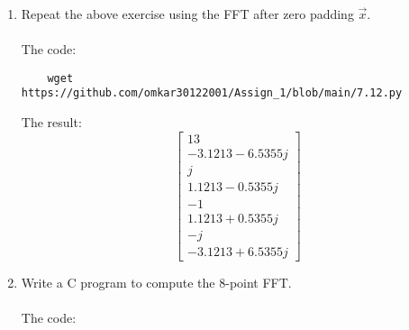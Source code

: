 \documentclass[journal,12pt,twocolumn]{IEEEtran}
\renewcommand\thesection{\arabic{section}}
\begin{document}
\begin{enumerate}[label=\thesection.\arabic*
	,ref=\thesection.\theenumi]
\begin{enumerate}[label=\arabic*.,ref=\thesection.\theenumi]
\begin{align}
\begin{bsmallmatrix}
			1	&	\brak{e^{\frac{-j2\pi}{6}}}^3	&	\brak{e^{\frac{-j2\pi}{6}}}^6	&	\brak{e^{\frac{-j2\pi}{6}}}^9	&	\brak{e^{\frac{-j2\pi}{6}}}^{12}	&	\brak{e^{\frac{-j2\pi}{6}}}^{15}\\
			1	&	\brak{e^{\frac{-j2\pi}{6}}}^4	&	\brak{e^{\frac{-j2\pi}{6}}}^8	&	\brak{e^{\frac{-j2\pi}{6}}}^{12}	&	\brak{e^{\frac{-j2\pi}{6}}}^{16}	&	\brak{e^{\frac{-j2\pi}{6}}}^{20}\\
			1	&	\brak{e^{\frac{-j2\pi}{6}}}^5	&	\brak{e^{\frac{-j2\pi}{6}}}^{10}	&	\brak{e^{\frac{-j2\pi}{6}}}^{15}	&	\brak{e^{\frac{-j2\pi}{6}}}^{20}	&	\brak{e^{\frac{-j2\pi}{6}}}^{25}
		\end{bsmallmatrix}
		\myvec{1\\2\\3\\4\\2\\1}
	\end{align}
	\begin{align}
		=\myvec{13\\-4 - \sqrt{3}j\\ 1\\-1\\1\\-4 + \sqrt{3}j}
	\end{align}
	\item Repeat the above exercise using the FFT
	after zero padding $\vec{x}$. \\
	\solution \\
	The code:
	\begin{lstlisting}
	wget https://github.com/omkar30122001/Assign_1/blob/main/7.12.py
	\end{lstlisting}
	The result:
	\begin{equation}
		\begin{bmatrix}
			13\\
			-3.1213-6.5355j\\
			j\\
			1.1213-0.5355j\\
			-1\\
			1.1213+0.5355j\\
			-j\\
			-3.1213+6.5355j
		\end{bmatrix}
	\end{equation}
	\item Write a C program to compute the 8-point FFT. \\
	\solution \\
	The code:
	\begin{lstlisting}

\end{lstlisting}
\end{enumerate}
\end{enumerate}
\end{document}
